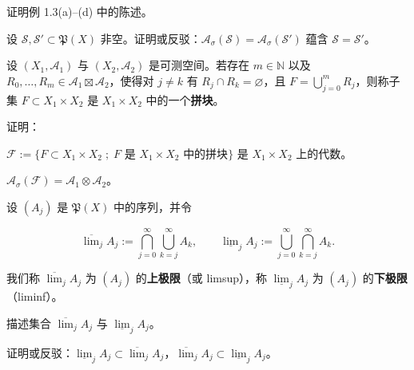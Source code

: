 \exerciseshead

\begin{exercises}
\item

证明例 1.3(a)–(d) 中的陈述。

\item

设 $ \mathcal{S},\mathcal{S}'\subset\mathfrak{P}(X) $ 非空。证明或反驳：$ \mathcal{A}_\sigma(\mathcal{S})=\mathcal{A}_\sigma(\mathcal{S}') $ 蕴含 $ \mathcal{S}=\mathcal{S}' $。

\item

设 $ (X_1,\mathcal{A}_1) $ 与 $ (X_2,\mathcal{A}_2) $ 是可测空间。若存在 $ m\in\mathbb{N} $ 以及 $ R_0,\ldots,R_m\in\mathcal{A}_1\boxtimes\mathcal{A}_2 $，使得对 $ j\ne k $ 有 $ R_j\cap R_k=\varnothing $，且 $ F=\bigcup_{j=0}^{m} R_j $，则称子集 $ F\subset X_1\times X_2 $ 是 $ X_1\times X_2 $ 中的一个\textbf{拼块}。

证明：

\begin{items}
\item

$ \mathcal{F} := \{ F\subset X_1\times X_2 \;;\; F \text{ 是 } X_1\times X_2 \text{ 中的拼块} \} $ 是 $ X_1\times X_2 $ 上的代数。

\item

$ \mathcal{A}_\sigma(\mathcal{F})=\mathcal{A}_1\otimes\mathcal{A}_2 $。

\end{items}

\item

设 $ (A_j) $ 是 $ \mathfrak{P}(X) $ 中的序列，并令

\[
\overline{\lim}_j A_j := \bigcap_{j=0}^{\infty}\bigcup_{k=j}^{\infty} A_k , \qquad \underline{\lim}_j A_j := \bigcup_{j=0}^{\infty}\bigcap_{k=j}^{\infty} A_k .
\]

我们称 $ \overline{\lim}_j A_j $ 为 $ (A_j) $ 的\textbf{上极限}（或 limsup），称 $ \underline{\lim}_j A_j $ 为 $ (A_j) $ 的\textbf{下极限}（liminf）。

\begin{items}
\item

描述集合 $ \overline{\lim}_j A_j $ 与 $ \underline{\lim}_j A_j $。

\item

证明或反驳：$ \underline{\lim}_j A_j\subset\overline{\lim}_j A_j $，$ \overline{\lim}_j A_j\subset\underline{\lim}_j A_j $。


\end{items}
\end{exercises}
